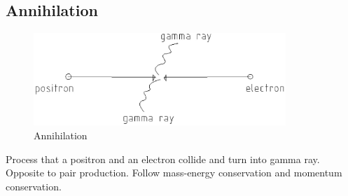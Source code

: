     \subsection{Annihilation}
        \begin{figure}[H]
            \begin{center}
                \includegraphics[height=3.5cm]{nuclear_charts/annih.eps}
            \end{center}
            \caption{Annihilation}
            \label{annih}
        \end{figure}

        Process that a positron and an electron collide and turn into gamma ray. Opposite to pair production. Follow mass-energy conservation and momentum conservation.

